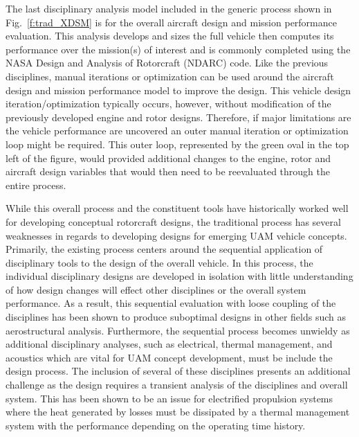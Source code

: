 The last disciplinary analysis model included in the generic process shown in Fig.~\ref{f:trad_XDSM} is for the overall aircraft design and mission performance evaluation.
This analysis develops and sizes the full vehicle then computes its performance over the mission(s) of interest and is commonly completed using the NASA Design and Analysis of Rotorcraft (NDARC) code.\cite{NDARC}
Like the previous disciplines, manual iterations or optimization can be used around the aircraft design and mission performance model to improve the design.
This vehicle design iteration/optimization typically occurs, however, without modification of the previously developed engine and rotor designs.
Therefore, if major limitations are the vehicle performance are uncovered an outer manual iteration or optimization loop might be required.  
This outer loop, represented by the green oval in the top left of the figure, would provided additional changes to the engine, rotor and aircraft design variables that would then need to be reevaluated through the entire process.

While this overall process and the constituent tools have historically worked well for developing conceptual rotorcraft designs, the traditional process has several weaknesses in regards to developing designs for emerging UAM vehicle concepts.
Primarily, the existing process centers around the sequential application of disciplinary tools to the design of the overall vehicle.
In this process, the individual disciplinary designs are developed in isolation with little understanding of how design changes will effect other disciplines or the overall system performance.
As a result, this sequential evaluation with loose coupling of the disciplines has been shown to produce suboptimal designs in other fields such as aerostructural analysis.\cite{Chittick:2007:B}
Furthermore, the sequential process becomes unwieldy as additional disciplinary analyses, such as electrical, thermal management, and acoustics which are vital for UAM concept development, must be include the design process.
The inclusion of several of these disciplines presents an additional challenge as the design requires a transient analysis of the disciplines and overall system.
This has been shown to be an issue for electrified propulsion systems where the heat generated by losses must be dissipated by a thermal management system with the performance depending on the operating time history.\cite{falck_electric_thermal_2017}







